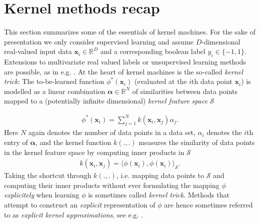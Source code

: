 \documentclass{article} %
\newcommand{\R}{\ensuremath{\mathds{R}}}
\newcommand{\va}{\boldsymbol{\alpha}}
\newcommand{\Bx}{\mathbf{x}}
\begin{document}
\section{Kernel methods recap}\label{sec:kernels}
This section summarizes some of the essentials of kernel machines. For the sake of presentation we only consider supervised learning and assume $D$-dimensional real-valued input data $\Bx_i\in\R^D$ and a corresponding boolean label $y_i\in\{-1,1\}$. Extensions to multivariate real valued labels or unsupervised learning methods are possible, as in e.g.  \cite{Lopez-Paz2014}. At the heart of kernel machines is the so-called {\em kernel trick}: The to-be-learned function $\phi^*(\Bx_i) $ (evaluated at the $i$th data point $\Bx_i$) is modelled as a linear combination $\va\in\R^N$ of similarities between data points mapped to a (potentially infinite dimensional) {\em kernel feature space} $\mathcal{S}$

\begin{align}\label{eq:kernel_trick}
\phi^*(\Bx_i)=\sum_{j=1}^N k(\Bx_i,\Bx_j)\alpha_j.
\end{align}
Here $N$ again denotes the number of data points in a data set, $\alpha_i$ denotes the $i$th entry of $\va$, and the kernel function $k(.,.)$ measures the similarity of data points in the kernel feature space by computing inner products in $\mathcal{S}$
\begin{align}\label{eq:kernel_function}
k(\Bx_i,\Bx_j)=\langle \phi(\Bx_i), \phi(\Bx_i)\rangle_{\mathcal{S}}.
\end{align}
%
Taking the shortcut through $k(.,.)$, i.e. mapping data points to $\mathcal{S}$ and computing their inner products without ever formulating the mapping $\phi$ {\em explicitely} when learning $\phi$ is sometimes called {\em kernel trick}. Methods that attempt to construct an {\em explicit} representation of $\phi$ are hence sometimes referred to as {\em explicit kernel approximations}, see e.g. \cite{Dai2014}. 
\end{document}
